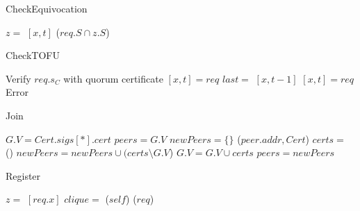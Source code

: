 \begin{algorithm}
\label{CheckEquivocation}
  \caption{CheckEquivocation}
  $z = $ \Storage$[x, t]$\;
  {
    \Revoke($req.S \cap z.S$)\;
  }
\end{algorithm}

\begin{algorithm}
\label{CheckTOFU}
  \caption{CheckTOFU}
  Verify $req.s_C$ with quorum certificate\;
  \eIf{\Storage$[x, 0] = \bot$}
  {
    \Storage$[x, t] = req$\;
  }{
    $last = $ \Storage$[x, t-1]$\;
    {
      \Storage$[x, t] = req$\;
    }{
      Error\;
    }
  }
\end{algorithm}

\ifdefined\ABSTRACT
\else

\begin{algorithm}
\label{Join}
  \caption{Join}
  $G.V = Cert.sigs[*].cert$\;
  $peers = G.V$\;
  {
    $newPeers = \{\}$\;
    {
      \Send($peer.addr, Cert$)\;
      $certs = $ \Receive()\;
      $newPeers = newPeers \cup (certs \setminus G.V$)\;
      $G.V = G.V \cup certs$\;
    }
    $peers = newPeers$\;
  }
\end{algorithm}

\begin{algorithm}
\label{Register}
  \caption{Register}
  $z = $ \Storage$[req.x]$\;
  {
    $clique = $ \FindMaximalClique($self$)\;
    {
      \Sign($req$)\;
    }
  }
\end{algorithm}

\fi
